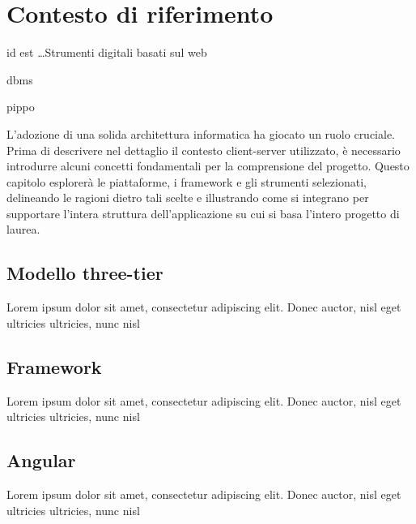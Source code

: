 \setlength{\headheight}{14.49998pt}
\addtolength{\topmargin}{-2.49998pt}
\chapter{Contesto di riferimento}
id est \dots Strumenti digitali basati sul web 


\gls{dbms}

pippo









L'adozione di una solida architettura informatica ha giocato un ruolo cruciale. 
Prima di descrivere nel dettaglio il contesto client-server utilizzato, è necessario introdurre alcuni concetti fondamentali per la comprensione del progetto.
Questo capitolo esplorerà le piattaforme, i framework e gli strumenti selezionati, delineando le ragioni dietro tali scelte e illustrando come si integrano per supportare l'intera struttura dell'applicazione su cui si basa l'intero progetto di laurea.

\section{Modello three-tier}
Lorem ipsum dolor sit amet, consectetur adipiscing elit. Donec auctor, nisl eget ultricies ultricies, nunc nisl

\section{Framework}
Lorem ipsum dolor sit amet, consectetur adipiscing elit. Donec auctor, nisl eget ultricies ultricies, nunc nisl

\section{Angular}
Lorem ipsum dolor sit amet, consectetur adipiscing elit. Donec auctor, nisl eget ultricies ultricies, nunc nisl